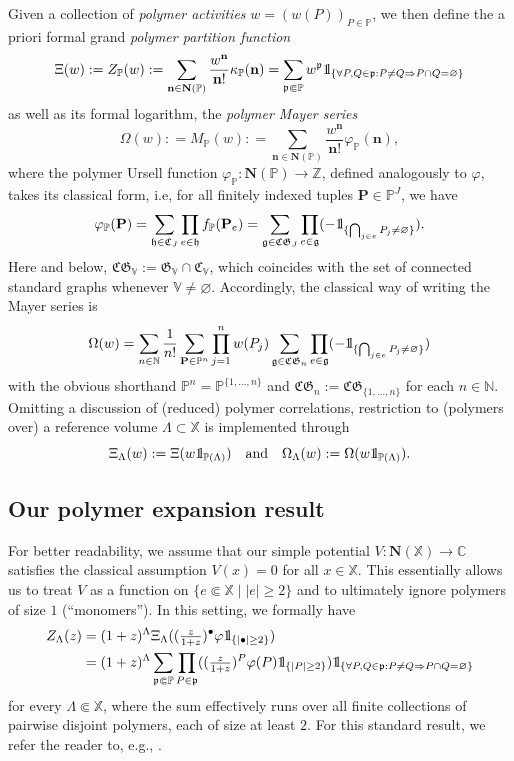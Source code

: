 \documentclass[reqno, 11pt]{amsart}
\theoremstyle{definition}
\newcommand{\N}{\mathbb{N}}
\newcommand{\Z}{\mathbb{Z}}
\newcommand{\C}{\mathbb{C}}
\renewcommand{\P}{\mathbb{P}}
\newcommand{\X}{\mathbb X}
\newcommand{\V}{\mathbb V}
\def\1{{\mathchoice {1\mskip-4mu\mathrm l}      
{1\mskip-4mu\mathrm l}
{1\mskip-4.5mu\mathrm l} {1\mskip-5mu\mathrm l}}}
\begin{document}
Given a collection of \emph{polymer activities} $w = (w(P))_{P \in \P}$,
we then define the a priori formal grand \emph{polymer partition function}
\[
	\Xi(w) : = Z_\P(w) : = \sum_{\mathbf n \in \mathbf N(\P)} \frac{w^\mathbf n}{\mathbf n!} \kappa_\P(\mathbf n) =\sum_{\mathfrak p \Subset \P} w^\mathfrak p \1_{\{\forall P, Q \in \mathfrak p : P \neq Q \Rightarrow P\cap Q = \varnothing\}}
\]
as well as its formal logarithm, the \emph{polymer Mayer series}
\[
	\Omega(w) : = M_\P(w) : = \sum_{\mathbf n \in \mathbf N(\P)} \frac{w^\mathbf n}{\mathbf n!} \varphi_\P(\mathbf n),
\]
where the polymer Ursell function $\varphi_\P : \mathbf N(\P) \to \Z$, defined analogously to $\varphi$, takes its classical form, i.e, for all finitely indexed tuples $\mathbf P \in \P^J$, we have
\[
	\varphi_\P(\mathbf P) = \sum_{\mathfrak h \in \mathfrak C_J} \prod_{e \in \mathfrak h} f_\P(\mathbf P_e) = \sum_{\mathfrak g \in \mathfrak{CG}_J} \prod_{e \in \mathfrak g} (-\1_{\{\bigcap_{j\in e} P_j \neq \varnothing\}}).
\]
Here and below, $\mathfrak{CG}_\V := \mathfrak G_\V \cap \mathfrak C_\V$, which coincides with the set of connected standard graphs whenever $\V\neq\varnothing$. 
Accordingly, the classical way of writing the Mayer series is
\[
	\Omega(w) = \sum_{n\in\N} \frac{1}{n!} \sum_{\mathbf P \in \P^n} \prod_{j=1}^n w(P_j) \sum_{\mathfrak g \in \mathfrak{CG}_n} \prod_{e \in \mathfrak g} (-\1_{\{\bigcap_{j\in e} P_j \neq \varnothing\}})
\]
with the obvious shorthand $\P^n = \P^{\{1,\ldots,n\}}$ and $\mathfrak{CG}_n := \mathfrak{CG}_{\{1,\ldots,n\}}$ for each $n \in \N$. 
Omitting a discussion of (reduced) polymer correlations, restriction to (polymers over) a reference volume $\Lambda \subset \X$ is implemented through
\[
	\Xi_\Lambda(w) : = \Xi(w \1_{\P(\Lambda)}) \quad \text{and} \quad \Omega_\Lambda(w) : = \Omega(w \1_{\P(\Lambda)}).
\]

\subsection{Our polymer expansion result}

For better readability, we assume that our simple potential $V : \mathbf N(\X) \to \C$ satisfies the classical assumption $V(x) = 0$ for all $x \in \X$. 
This essentially allows us to treat $V$ as a function on $\{e \Subset \X \mid |e| \geq 2\}$ and to ultimately ignore polymers of size $1$ (``monomers''). 
In this setting, we formally have
\begin{align*}
	Z_\Lambda(z) &= (1+z)^\Lambda \Xi_\Lambda(({\textstyle \frac{z}{1+z}})^\bullet \varphi \1_{\{|\bullet| \geq 2\}}) \\
	&= (1+z)^\Lambda \sum_{\mathfrak p \Subset \P} \prod_{P \in \mathfrak p} (({\textstyle \frac{z}{1+z}})^P \varphi(P) \1_{\{|P| \geq 2\}}) \1_{\{\forall P, Q \in \mathfrak p : P \neq Q \Rightarrow P\cap Q = \varnothing\}}
\end{align*}
for every $\Lambda \Subset \X$, where the sum effectively runs over all finite collections of pairwise disjoint polymers, each of size at least $2$.
For this standard result, we refer the reader to, e.g., \cite[Section~7]{ref:procacci-scoppola}. 
\end{document}

